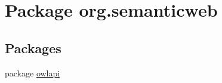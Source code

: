 \hypertarget{namespaceorg_1_1semanticweb}{\section{Package org.\-semanticweb}
\label{namespaceorg_1_1semanticweb}
}
\subsection*{Packages}
\begin{DoxyCompactItemize}
\item 
package \hyperlink{namespaceorg_1_1semanticweb_1_1owlapi}{owlapi}
\end{DoxyCompactItemize}
